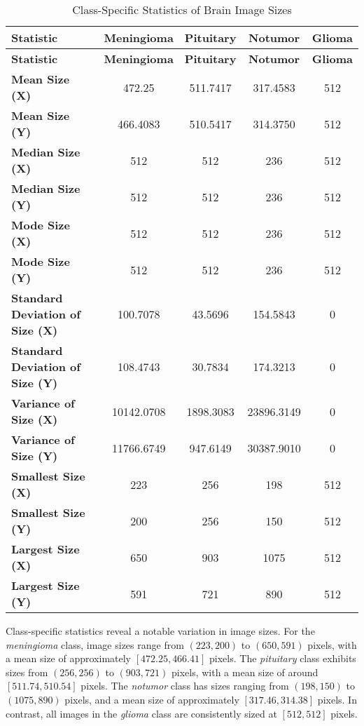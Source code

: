 \begin{longtable}{|l|c|c|c|c|}
\caption{Class-Specific Statistics of Brain Image Sizes}\\
\hline
\textbf{Statistic} & \textbf{Meningioma} & \textbf{Pituitary} & \textbf{Notumor} & \textbf{Glioma} \\
\hline
\endfirsthead
\hline
\textbf{Statistic} & \textbf{Meningioma} & \textbf{Pituitary} & \textbf{Notumor} & \textbf{Glioma} \\
\hline
\endhead
\hline
\endfoot
\endlastfoot
\textbf{Mean Size (X)} & 472.25 & 511.7417 & 317.4583 & 512 \\
\hline
\textbf{Mean Size (Y)} & 466.4083 & 510.5417 & 314.3750 & 512 \\
\hline
\textbf{Median Size (X)} & 512 & 512 & 236 & 512 \\
\hline
\textbf{Median Size (Y)} & 512 & 512 & 236 & 512 \\
\hline
\textbf{Mode Size (X)} & 512 & 512 & 236 & 512 \\
\hline
\textbf{Mode Size (Y)} & 512 & 512 & 236 & 512 \\
\hline
\textbf{Standard Deviation of Size (X)} & 100.7078 & 43.5696 & 154.5843 & 0 \\
\hline
\textbf{Standard Deviation of Size (Y)} & 108.4743 & 30.7834 & 174.3213 & 0 \\
\hline
\textbf{Variance of Size (X)} & 10142.0708 & 1898.3083 & 23896.3149 & 0 \\
\hline
\textbf{Variance of Size (Y)} & 11766.6749 & 947.6149 & 30387.9010 & 0 \\
\hline
\textbf{Smallest Size (X)} & 223 & 256 & 198 & 512 \\
\hline
\textbf{Smallest Size (Y)} & 200 & 256 & 150 & 512 \\
\hline
\textbf{Largest Size (X)} & 650 & 903 & 1075 & 512 \\
\hline
\textbf{Largest Size (Y)} & 591 & 721 & 890 & 512 \\
\hline
\end{longtable}

Class-specific statistics reveal a notable variation in image sizes. For the \textit{meningioma} class, image sizes range from $(223, 200)$ to $(650, 591)$ pixels, with a mean size of approximately $[472.25, 466.41]$ pixels. The \textit{pituitary} class exhibits sizes from $(256, 256)$ to $(903, 721)$ pixels, with a mean size of around $[511.74, 510.54]$ pixels. The \textit{notumor} class has sizes ranging from $(198, 150)$ to $(1075, 890)$ pixels, and a mean size of approximately $[317.46, 314.38]$ pixels. In contrast, all images in the \textit{glioma} class are consistently sized at $[512, 512]$ pixels.

